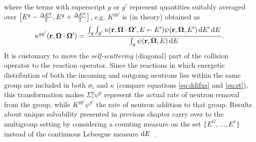 where the terms with superscript $g$ or $g'$ represent quantities suitably averaged over 
\mbox{$\bigl[E^{g}-\tfrac{\Delta E^{g}}{2}, E^{g}+\tfrac{\Delta E^{g}}{2}\bigr]$}, e.g. $K^{gg'}$ is (in theory) obtained as
\begin{equation}\label{eq:mg-kappa}
	\kappa^{gg'}(\mathbf{r},\mathbf{\Omega}\cdot\mathbf{\Omega}') = \frac{\int_{g}\int_{g'} \kappa(\mathbf{r},\mathbf{\Omega}\cdot\mathbf{\Omega}',E \shortleftarrow
	E')\psi(\mathbf{r},\mathbf{\Omega},E')\,\text{d}E'\,\text{d}E\,}{\int_{g}\psi(\mathbf{r}, \mathbf{\Omega}, E)\,\text{d}E\,}.
\end{equation}
It is customary to move the \textit{self-scattering} (diagonal) part of the
collision operator to the reaction operator. Since the reactions in which energetic distribution of both the incoming 
and outgoing neutrons lies within the same group are included in both $\sigma_t$ and $\kappa$  (compare equations
\eqref{eq:ddifxs} and \eqref{eq:st}), this transformation makes $\Sigma_r^g\psi^g$ represent the actual rate of neutron
removal from the group, while $K^{gg'}\psi^{g'}$ the rate of neutron addition to that group. Results about unique
solvability presented in previous chapter carry over to the multigroup setting by considering a counting measure on the
set $\{E^G,\ldots,E^1\}$ instead of the continuous Lebesgue measure $\text{d}E\,$ \cite[Chap. XXI \S 2]{DautrayLions}.

